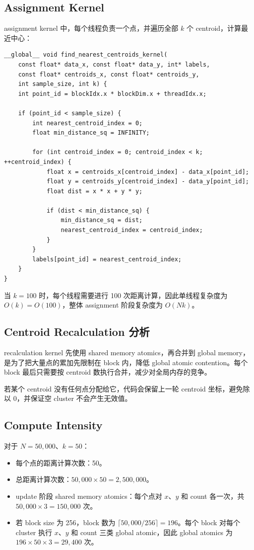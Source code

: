\documentclass[UTF8,a4paper,12pt,fontset=none]{ctexart}
\begin{document}
\subsection{Assignment Kernel}

assignment kernel 中，每个线程负责一个点，并遍历全部 $k$ 个 centroid，计算最近中心：

\begin{lstlisting}
__global__ void find_nearest_centroids_kernel(
    const float* data_x, const float* data_y, int* labels,
    const float* centroids_x, const float* centroids_y,
    int sample_size, int k) {
    int point_id = blockIdx.x * blockDim.x + threadIdx.x;

    if (point_id < sample_size) {
        int nearest_centroid_index = 0;
        float min_distance_sq = INFINITY;

        for (int centroid_index = 0; centroid_index < k; ++centroid_index) {
            float x = centroids_x[centroid_index] - data_x[point_id];
            float y = centroids_y[centroid_index] - data_y[point_id];
            float dist = x * x + y * y;

            if (dist < min_distance_sq) {
                min_distance_sq = dist;
                nearest_centroid_index = centroid_index;
            }
        }
        labels[point_id] = nearest_centroid_index;
    }
}
\end{lstlisting}

当 $k=100$ 时，每个线程需要进行 100 次距离计算，因此单线程复杂度为 $O(k)=O(100)$，整体 assignment 阶段复杂度为 $O(Nk)$。

\subsection{Centroid Recalculation 分析}

recalculation kernel 先使用 shared memory atomics，再合并到 global memory，是为了把大量点的累加先限制在 block 内，降低 global atomic contention。每个 block 最后只需要按 centroid 数执行合并，减少对全局内存的竞争。

若某个 centroid 没有任何点分配给它，代码会保留上一轮 centroid 坐标，避免除以 0，并保证空 cluster 不会产生无效值。

\subsection{Compute Intensity}

对于 $N=50,000$、$k=50$：

\begin{itemize}
  \item 每个点的距离计算次数：50。
  \item 总距离计算次数：$50,000\times50=2,500,000$。
  \item update 阶段 shared memory atomics：每个点对 $x$、$y$ 和 count 各一次，共 $50,000\times3=150,000$ 次。
  \item 若 block size 为 256，block 数为 $\lceil 50,000/256\rceil=196$。每个 block 对每个 cluster 执行 $x$、$y$ 和 count 三类 global atomic，因此 global atomics 为 $196\times50\times3=29,400$ 次。
\end{itemize}
\end{document}

